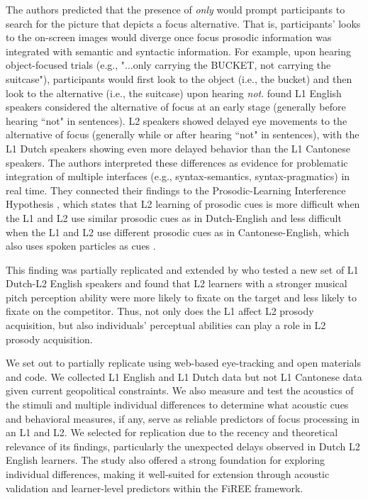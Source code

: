 The authors predicted that the presence of \textit{only} would prompt participants to search for the picture that depicts a focus alternative. That is, participants' looks to the on-screen images would diverge once focus prosodic information was integrated with semantic and syntactic information. For example, upon hearing object-focused trials (e.g., "...only carrying the BUCKET, not carrying the suitcase"), participants would first look to the object (i.e., the bucket) and then look to the alternative (i.e., the suitcase) upon hearing \textit{not}. \cite{ge2021a} found L1 English speakers considered the alternative of focus at an early stage (generally before hearing ``not" in sentences). L2 speakers showed delayed eye movements to the alternative of focus (generally while or after hearing ``not" in sentences), with the L1 Dutch speakers showing even more delayed behavior than the L1 Cantonese speakers. The authors interpreted these differences as evidence for problematic integration of multiple interfaces (e.g., syntax-semantics, syntax-pragmatics) in real time. They connected their findings to the Prosodic-Learning Interference Hypothesis \parencite{tremblay2016effects, tremblay2021re}, which states that L2 learning of prosodic cues is more difficult when the L1 and L2 use similar prosodic cues as in Dutch-English and less difficult when the L1 and L2 use different prosodic cues as in Cantonese-English, which also uses spoken particles as cues \parencite[see also][]{ge2021b}. 

This finding was partially replicated and extended by \cite{jansen2023influence} who tested a new set of L1 Dutch-L2 English speakers and found that L2 learners with a stronger musical pitch perception ability were more likely to fixate on the target and less likely to fixate on the competitor. Thus, not only does the L1 affect L2 prosody acquisition, but also individuals' perceptual abilities can play a role in L2 prosody acquisition.

We set out to partially replicate \cite{ge2021a} using web-based eye-tracking and open materials and code. We collected L1 English and L1 Dutch data but not L1 Cantonese data given current geopolitical constraints. We also measure and test the acoustics of the stimuli and multiple individual differences to determine what acoustic cues and behavioral measures, if any, serve as reliable predictors of focus processing in an L1 and L2. We selected \cite{ge2021a} for replication due to the recency and theoretical relevance of its findings, particularly the unexpected delays observed in Dutch L2 English learners. The study also offered a strong foundation for exploring individual differences, making it well-suited for extension through acoustic validation and learner-level predictors within the FiREE framework.

